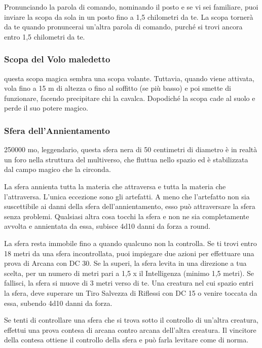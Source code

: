 \begin{multicols}{2}
	Pronunciando la parola di comando, nominando il posto e se vi sei familiare, puoi inviare la scopa da sola in un posto fino a 1,5 chilometri da te. La scopa tornerà da te quando pronuncerai un'altra parola di comando, purché si trovi ancora entro 1,5 chilometri da te.

	\subsubsection*{Scopa del Volo maledetto}
	questa scopa magica sembra una scopa volante. Tuttavia, quando viene attivata, vola fino a 15 m di altezza o fino al soffitto (se più basso) e poi smette di funzionare, facendo precipitare chi la cavalca. Dopodiché la scopa cade al suolo e perde il suo potere magico.

	\subsubsection*{Sfera dell'Annientamento}
	250000 mo, leggendario, questa sfera nera di 50 centimetri di diametro è in realtà un foro nella struttura del multiverso, che fluttua nello spazio ed è stabilizzata dal campo magico che la circonda.

	La sfera annienta tutta la materia che attraversa e tutta la materia che l'attraversa. L'unica eccezione sono gli artefatti. A meno che l'artefatto non sia suscettibile ai danni della sfera dell'annientamento, esso può attraversare la sfera senza problemi. Qualsiasi altra cosa tocchi la sfera e non ne sia completamente avvolta e annientata da essa, subisce 4d10 danni da forza a round.

	La sfera resta immobile fino a quando qualcuno non la controlla. Se ti trovi entro 18 metri da una sfera incontrollata, puoi impiegare due azioni per effettuare una prova di Arcana con DC 30. Se la superi, la sfera levita in una direzione a tua scelta, per un numero di metri pari a 1,5 x il Intelligenza (minimo 1,5 metri). Se fallisci, la sfera si muove di 3 metri verso di te. Una creatura nel cui spazio entri la sfera, deve superare un Tiro Salvezza di Riflessi con DC 15 o venire toccata da essa, subendo 4d10 danni da forza.

	Se tenti di controllare una sfera che si trova sotto il controllo di un'altra creatura, effettui una prova contesa di arcana contro arcana dell'altra creatura. Il vincitore della contesa ottiene il controllo della sfera e può farla levitare come di norma.


\end{multicols}

